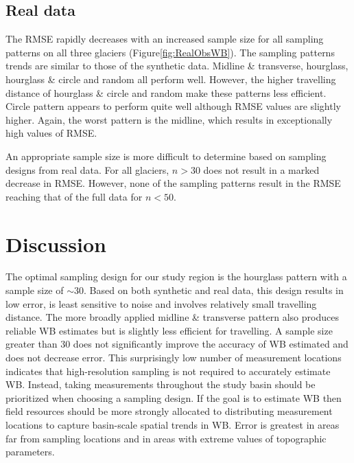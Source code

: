 \documentclass[twocolumn,letterpaper]{igs}
\begin{document}
\subsection{Real data}

The RMSE rapidly decreases with an increased sample size for all sampling patterns on all three glaciers (Figure\ref{fig:RealObsWB}).  The sampling patterns trends are similar to those of the synthetic data. Midline \& transverse, hourglass, hourglass \& circle and random all perform well. However, the higher travelling distance of hourglass \& circle and random make these patterns less efficient. Circle pattern appears to perform quite well although RMSE values are slightly higher. Again, the worst pattern is the midline, which results in exceptionally high values of RMSE. 

An appropriate sample size is more difficult to determine based on sampling designs from real data. For all glaciers, $n>30$ does not result in a marked decrease in RMSE. However, none of the sampling patterns result in the RMSE reaching that of the full data for $n<50$. 

\section{Discussion}

The optimal sampling design for our study region is the hourglass pattern with a sample size of $\sim30$. Based on both synthetic and real data, this design results in low error, is least sensitive to noise and involves relatively small travelling distance. The more broadly applied midline \& transverse pattern also produces reliable WB estimates but is slightly less efficient for travelling. A sample size greater than 30 does not significantly improve the accuracy of WB estimated and does not decrease error. This surprisingly low number of measurement locations indicates that high-resolution sampling is not required to accurately estimate WB. Instead, taking measurements throughout the study basin should be prioritized when choosing a sampling design. If the goal is to estimate WB then field resources should be more strongly allocated to distributing measurement locations to capture basin-scale spatial trends in WB. Error is greatest in areas far from sampling locations and in areas with extreme values of topographic parameters. 
\end{document}
